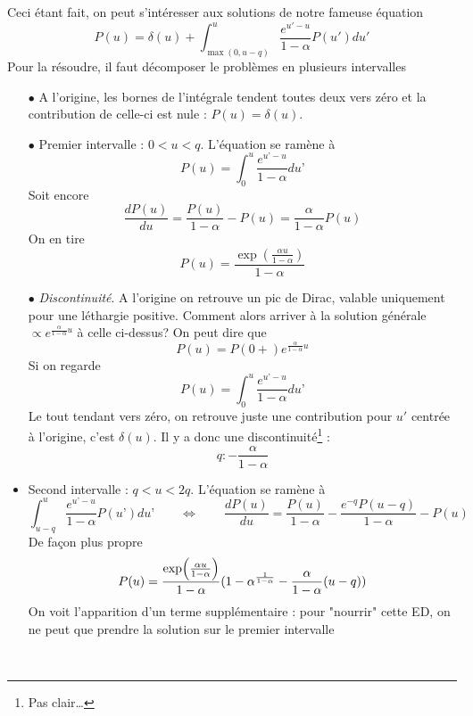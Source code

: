 	Ceci étant fait, on peut s'intéresser aux solutions de notre fameuse équation
	\begin{equation}
	P(u) = \delta (u) + \int_{\max (0,u - q)}^u   \frac{{{e^{u' - u}}}}{{1 - \alpha }}P(u')du'
	\end{equation}
	Pour la résoudre, il faut décomposer le problèmes en plusieurs intervalles
	\begin{itemize}
	\item[$\bullet$] A l'origine, les bornes de l'intégrale tendent toutes deux vers zéro et la 
	contribution de celle-ci est nule : $P(u) = \delta (u)$.
	\item[$\bullet$] Premier intervalle : $0<u<q$. L'équation se ramène à
	\begin{equation}
	P(u) = \int_0^u \frac{e^{u’-u}}{1-\alpha}du’
	\end{equation}
	Soit encore
	\begin{equation}
	\frac{dP(u)}{du} = \frac{P(u)}{1-\alpha}-P(u) = \frac{\alpha}{1-\alpha} P(u)
	\end{equation}
	On en tire
	\begin{equation}
	P(u) = \frac{{\exp (\frac{{\alpha u}}{{1 - \alpha }})}}{{1 - \alpha }}
	\end{equation}
	\item[$\bullet$] \textit{Discontinuité}. A l'origine on retrouve un pic de Dirac, valable 
	uniquement pour une léthargie positive. Comment alors arriver à la solution générale 
	$\propto e^{\frac{\alpha}{1-\alpha}u}$ à celle ci-dessus?  On peut dire que
	\begin{equation}
	P(u) = P(0+) e^{\frac{\alpha}{1-\alpha}u} 
	\end{equation}
	Si on regarde 
	\begin{equation}
	P(u) = \int_0^u \frac{e^{u’-u}}{1-\alpha}du’ 
	\end{equation}
	Le tout tendant vers zéro, on retrouve juste une contribution pour $u'$ centrée à l'origine, c'est
	$\delta(u)$. Il y a donc une discontinuité\footnote{Pas clair\dots} :
	\begin{equation}
	q : - \frac{\alpha }{{1 - \alpha }}
	\end{equation}
	\item Second intervalle : $q<u<2q$. L'équation se ramène à
	\begin{equation}
	\int_{u-q}^u \frac{e^{u’-u}}{1-\alpha}P(u’)du’\qquad\Leftrightarrow\qquad
	\frac{dP(u)}{du} = \frac{P(u)}{1-\alpha} -\frac{e^{-q}P(u-q)}{1-\alpha}-P(u)
	\end{equation}
	De façon plus propre
	\begin{equation}
	P(u) = \frac{{\exp ({\textstyle{{\alpha u} \over {1 - \alpha }}})}}{{1 - \alpha }}(1 - {\alpha
	 ^{\frac{1}{{1 - \alpha }}}} - \frac{\alpha }{{1 - \alpha }}(u - q))
	\end{equation}
	On voit l'apparition d'un terme supplémentaire : pour "nourrir" cette ED, on ne peut que prendre 	
	la solution sur le premier intervalle
	\end{itemize}\ 
	
